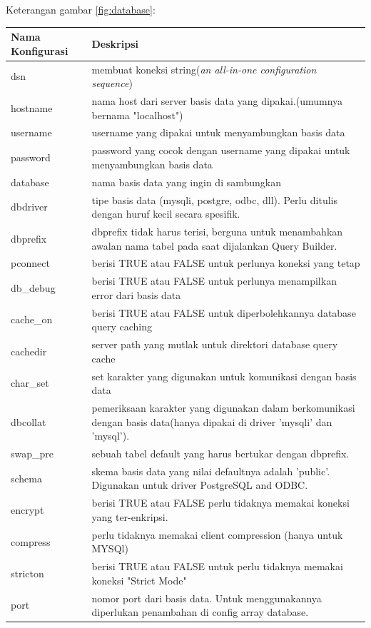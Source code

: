 	Keterangan gambar \ref{fig:database}:
	\begin{center}
	\begin{tabular}{| m{5cm} | m{10cm} |}
		\hline
		Nama Konfigurasi & Deskripsi\\
		\hline
		dsn & membuat koneksi string(\textit{an all-in-one configuration sequence})\\
		\hline
		hostname & nama host dari server basis data yang dipakai.(umumnya bernama "localhost")\\
		\hline
		username & username yang dipakai untuk menyambungkan basis data\\
		\hline
		password & password yang cocok dengan username yang dipakai untuk menyambungkan basis data\\
		\hline
		database & nama basis data yang ingin di sambungkan\\
		\hline
		dbdriver & tipe basis data (mysqli, postgre, odbc, dll). Perlu ditulis dengan huruf kecil secara spesifik.\\
		\hline
		dbprefix & dbprefix tidak harus terisi, berguna untuk menambahkan awalan nama tabel pada saat dijalankan Query Builder.\\
		\hline
		pconnect & berisi TRUE atau FALSE untuk perlunya koneksi yang tetap\\
		\hline
		db\_debug & berisi TRUE atau FALSE untuk perlunya menampilkan error dari basis data\\
		\hline
		cache\_on & berisi TRUE atau FALSE untuk diperbolehkannya database query caching\\
		\hline
		cachedir & server path yang mutlak untuk direktori database query cache\\
		\hline
		char\_set & set karakter yang digunakan untuk komunikasi dengan basis data\\
		\hline
		dbcollat & pemeriksaan karakter yang digunakan dalam berkomunikasi dengan basis data(hanya dipakai di driver 'mysqli' dan 'mysql').\\
		\hline
		swap\_pre & sebuah tabel default yang harus bertukar dengan dbprefix.\\
		\hline
		schema & skema basis data yang nilai defaultnya adalah 'public'. Digunakan untuk driver PostgreSQL and ODBC.\\
		\hline
		encrypt &  berisi TRUE atau FALSE perlu tidaknya memakai koneksi yang ter-enkripsi.\\
		\hline
		compress & perlu tidaknya memakai client compression (hanya untuk MYSQl)\\
		\hline
		stricton &  berisi TRUE atau FALSE untuk perlu tidaknya memakai koneksi "Strict Mode" \\
		\hline
		port & nomor port dari basis data. Untuk menggunakannya diperlukan penambahan di config array database.\\
		\hline
	\end{tabular}
\end{center}
	
